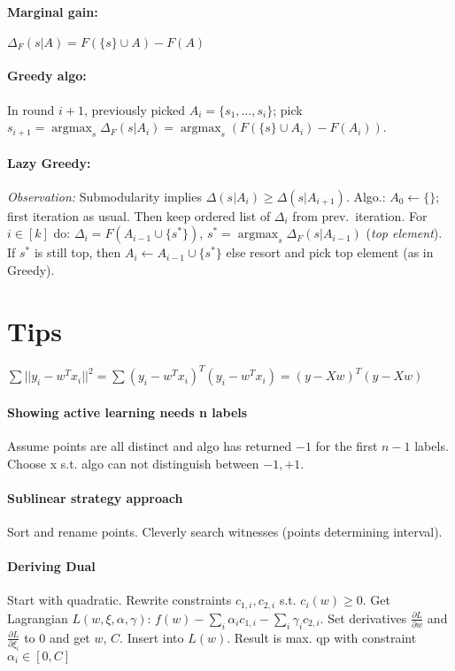 \documentclass[10pt]{scrartcl}
\DeclareMathOperator{\argmax}{argmax}
\begin{document}
\begin{multicols}{3}
\paragraph{Marginal gain:}
$\Delta_F(s|A)=F(\{s\} \cup A)-F(A)$

\paragraph{Greedy algo:}
In round $i+1$, previously picked $A_i=\{s_1,\dots,s_i\}$; pick $s_{i+1} = \argmax_{s} \Delta_F(s|A_i) = \argmax_{s} (F(\{s\}\cup A_i)-F(A_i))$.

\paragraph{Lazy Greedy:}
\emph{Observation:} Submodularity implies $\Delta(s|A_i) \geq \Delta(s|A_{i+1})$.
Algo.: $A_0 \leftarrow \{\}$; first iteration as usual.
Then keep ordered list of $\Delta_i$ from prev.\ iteration.
For $i \in [k]$ do: $\Delta_i=F(A_{i-1}\cup \{s^*\})$, $s^*=\argmax_s\Delta_F(s|A_{i-1})$ (\emph{top element}).
If $s^*$ is still top, then $A_i \leftarrow A_{i-1}\cup \{s^*\}$ else resort and pick top element (as in Greedy). 


\section{Tips}

$\sum{||y_i - w^Tx_i||^2} = \sum{(y_i - w^Tx_i)^T(y_i - w^Tx_i)} = (y - Xw)^T(y-Xw)$

\paragraph{Showing active learning needs n labels} Assume points are all distinct and algo has returned $-1$ for the first $n-1$ labels. Choose x s.t. algo can not distinguish between $-1,+1$.

\paragraph{Sublinear strategy approach} Sort and rename points. Cleverly search witnesses (points determining interval).

\paragraph{Deriving Dual} Start with quadratic. Rewrite constraints $c_{1,i},c_{2,i}$ s.t. $c_i(w)\geq0$. Get Lagrangian $L(w,\xi,\alpha,\gamma )$: $f(w) - \sum_i{\alpha_ic_{1,i}} - \sum_i{\gamma_ic_{2,i}}$. Set derivatives $\frac{\partial L}{\partial w}$ and $\frac{\partial L}{\partial \xi_i}$ to $0$ and get $w$, $C$. Insert into $L(w)$. Result is max. qp with constraint $\alpha_i \in [0,C]$

\end{multicols}
\end{document}
